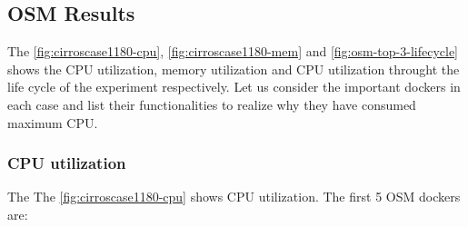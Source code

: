 \subsection{OSM Results}
The \ref{fig:cirroscase1180-cpu}, \ref{fig:cirroscase1180-mem} and \ref{fig:osm-top-3-lifecycle} shows the CPU utilization, memory utilization and CPU utilization throught the life cycle of the experiment respectively. Let us consider the important dockers in each case and list their functionalities to realize why they have consumed maximum CPU.

\subsubsection{CPU utilization}

The The \ref{fig:cirroscase1180-cpu} shows CPU utilization. The first 5 OSM dockers are:

